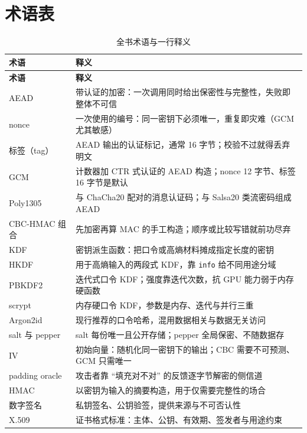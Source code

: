 \documentclass[12pt,a4paper,fontset=fandol]{ctexbook}
\newcommand{\Tp}[1]{\texttt{#1}}
\begin{document}

\chapter{术语表}

\begin{footnotesize}
\begin{longtable}{@{}>{\raggedright\arraybackslash}p{}
                  >{\raggedright\arraybackslash}p{}@{}}
\caption{全书术语与一行释义}\\
\toprule
\textbf{术语} & \textbf{释义} \\
\midrule
\endfirsthead
\toprule
\textbf{术语} & \textbf{释义} \\
\midrule
\endhead
AEAD & 带认证的加密：一次调用同时给出保密性与完整性，失败即整体不可信 \\
nonce & 一次使用的编号：同一密钥下必须唯一，重复即灾难（GCM 尤其敏感） \\
标签（tag） & AEAD 输出的认证标记，通常 16 字节；校验不过就得丢弃明文 \\
GCM & 计数器加 CTR 式认证的 AEAD 构造；nonce 12 字节、标签 16 字节是默认 \\
Poly1305 & 与 ChaCha20 配对的消息认证码；与 Salsa20 类流密码组成 AEAD \\
CBC-HMAC 组合 & 先加密再算 MAC 的手工构造；顺序或比较写错就前功尽弃 \\
KDF & 密钥派生函数：把口令或高熵材料摊成指定长度的密钥 \\
HKDF & 用于高熵输入的两段式 KDF，靠 \Tp{info} 给不同用途分域 \\
PBKDF2 & 迭代式口令 KDF；强度靠迭代次数，抗 GPU 能力弱于内存硬函数 \\
scrypt & 内存硬口令 KDF，参数是内存、迭代与并行三重 \\
Argon2id & 现行推荐的口令哈希，混用数据相关与数据无关访问 \\
salt 与 pepper & salt 每份唯一且公开存储；pepper 全局保密、不随数据存 \\
IV & 初始向量：随机化同一密钥下的输出；CBC 需要不可预测、GCM 只需唯一 \\
padding oracle & 攻击者靠 ``填充对不对'' 的反馈逐字节解密的侧信道 \\
HMAC & 以密钥为输入的摘要构造，用于仅需要完整性的场合 \\
数字签名 & 私钥签名、公钥验签，提供来源与不可否认性 \\
X.509 & 证书格式标准：主体、公钥、有效期、签发者与用途约束 \\

\end{longtable}
\end{footnotesize}
\end{document}
